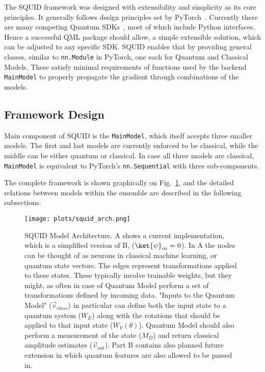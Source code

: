 The SQUID framework was designed with extensibility and simplicity as its core principles.
It generally follows design principles set by PyTorch~\cite{PyTorch}.
Currently there are many competing Quantum SDKs~\cite{smith2016practical, Qiskit, Cirq}, most of which include Python interfaces.
Hence a successful QML package should allow, a simple extensible solution, which can be adjusted to any specific SDK.
SQUID enables that by providing general classes, similar to \texttt{nn.Module} in PyTorch, one each for Quantum and Classical Models.
These satisfy minimal requirements of functions used by the backend \texttt{MainModel} to properly propagate the gradient through combinations of the models.

\subsection{Framework Design}
Main component of SQUID is the \texttt{MainModel}, which itself accepts three smaller models.
The first and last models are currently enforced to be classical, while the middle can be either quantum or classical. In case all three models are classical, \texttt{MainModel} is equivalent to PyTorch's \texttt{nn.Sequential} with three sub-components.

The complete framework is shown graphically on Fig.~\ref{fig:model-arch}, and the detailed relations between models within the ensemble are described in the following subsections.

	\begin{figure}
	\centering
	\texttt{[image: plots/squid\_arch.png]}
	\caption{
		SQUID Model Architecture. A shows a current implementation, which is a simplified version of B, ($\ket{\psi}_{in} = 0$).
		In A the nodes can be thought of as neurons in classical machine learning, or quantum state vectors.
		The edges represent transformations applied to these states.
		These typically involve trainable weights, but they might, as often in case of Quantum Model perform a set of transformations defined by incoming data.
		"Inputs to the Quantum Model" ($\vec{v}_{class}$) in particular can define both the input state to a quantum system ($W_E$) along with the rotations that should be applied to that input state ($W_V(\theta)$).
		Quantum Model should also perform a measurement of the state ($M_D$) and return classical amplitude estimates ($\vec{v}_{out}$).
		Part B contains also planned future extension in which quantum features are also allowed to be passed in.
	}
	\label{fig:model-arch}
\end{figure}



